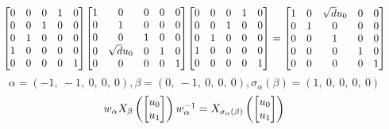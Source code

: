 \documentclass[11pt]{article}
\theoremstyle{definition}
\begin{document}
\[
\scaletoalign{\textwidth}{{\left[\begin{matrix}0 & 0 & 0 & 1 & 0\\0 & 0 & 1 & 0 & 0\\0 & 1 & 0 & 0 & 0\\1 & 0 & 0 & 0 & 0\\0 & 0 & 0 & 0 & 1\end{matrix}\right]} {\left[\begin{matrix}1 & 0 & 0 & 0 & 0\\0 & 1 & 0 & 0 & 0\\0 & 0 & 1 & 0 & 0\\0 & \sqrt{d} u_{0} & 0 & 1 & 0\\0 & 0 & 0 & 0 & 1\end{matrix}\right]} {\left[\begin{matrix}0 & 0 & 0 & 1 & 0\\0 & 0 & 1 & 0 & 0\\0 & 1 & 0 & 0 & 0\\1 & 0 & 0 & 0 & 0\\0 & 0 & 0 & 0 & 1\end{matrix}\right]} = {\left[\begin{matrix}1 & 0 & \sqrt{d} u_{0} & 0 & 0\\0 & 1 & 0 & 0 & 0\\0 & 0 & 1 & 0 & 0\\0 & 0 & 0 & 1 & 0\\0 & 0 & 0 & 0 & 1\end{matrix}\right]}}
\]
\[
\alpha = \left( -1, \  -1, \  0, \  0, \  0\right), \beta = \left( 0, \  -1, \  0, \  0, \  0\right), \sigma_{\alpha}(\beta) = \left( 1, \  0, \  0, \  0, \  0\right)
\]
\[
\scaletoalign{\textwidth}{w_{\alpha} X_{\beta}\left(\left[\begin{matrix}u_{0}\\u_{1}\end{matrix}\right]\right) w_{\alpha}^{-1} = X_{\sigma_{\alpha}\left(\beta\right)}\left(\left[\begin{matrix}u_{0}\\u_{1}\end{matrix}\right]\right)}
\]
\end{document}
